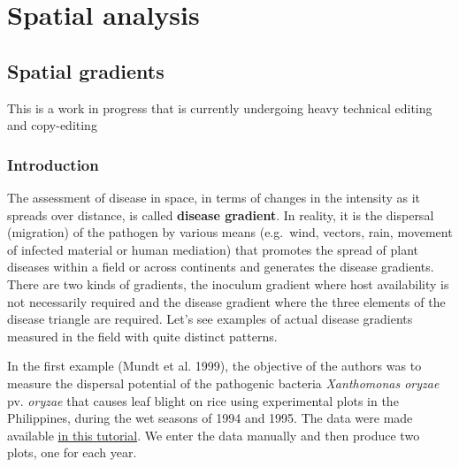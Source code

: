 \documentclass[
  letterpaper,
  DIV=11,
  numbers=noendperiod]{scrreprt}
\begin{document}
\part{Spatial analysis}

\hypertarget{spatial-gradients}{%
\chapter{Spatial gradients}\label{spatial-gradients}}

\begin{tcolorbox}[enhanced jigsaw, rightrule=.15mm, left=2mm, breakable, colframe=quarto-callout-note-color-frame, toprule=.15mm, leftrule=.75mm, bottomrule=.15mm, colback=white, arc=.35mm, opacityback=0]
\begin{minipage}[t]{5.5mm}
\textcolor{quarto-callout-note-color}{\faInfo}
\end{minipage}%
\begin{minipage}[t]{\textwidth - 5.5mm}
This is a work in progress that is currently undergoing heavy technical
editing and copy-editing\end{minipage}%
\end{tcolorbox}

\hypertarget{introduction-1}{%
\section{Introduction}\label{introduction-1}}

The assessment of disease in space, in terms of changes in the intensity
as it spreads over distance, is called \textbf{disease gradient}. In
reality, it is the dispersal (migration) of the pathogen by various
means (e.g.~wind, vectors, rain, movement of infected material or human
mediation) that promotes the spread of plant diseases within a field or
across continents and generates the disease gradients. There are two
kinds of gradients, the inoculum gradient where host availability is not
necessarily required and the disease gradient where the three elements
of the disease triangle are required. Let's see examples of actual
disease gradients measured in the field with quite distinct patterns.

In the first example (Mundt et al. 1999), the objective of the authors
was to measure the dispersal potential of the pathogenic bacteria
\emph{Xanthomonas oryzae} pv. \emph{oryzae} that causes leaf blight on
rice using experimental plots in the Philippines, during the wet seasons
of 1994 and 1995. The data were made available
\href{https://www.apsnet.org/edcenter/disimpactmngmnt/topc/EcologyAndEpidemiologyInR/ModelingDispersalGradients/Pages/PrimaryDiseaseGradientsofBacteria.aspx}{in
this tutorial}. We enter the data manually and then produce two plots,
one for each year.
\end{document}
